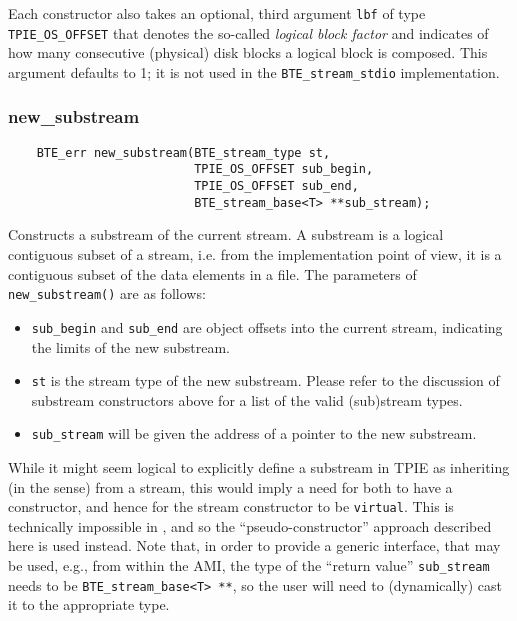 Each constructor also takes an optional, third argument
\lstinline|lbf| of type \lstinline|TPIE_OS_OFFSET| that denotes the
so-called \emph{logical block factor} and indicates of how many
consecutive (physical) disk blocks a logical block is composed. This
argument defaults to 1; it is not used in the
\lstinline|BTE_stream_stdio| implementation.

\vspace*{\baselineskip}
\subsubsection{new\_substream}

\begin{lstlisting}
    BTE_err new_substream(BTE_stream_type st, 
                          TPIE_OS_OFFSET sub_begin, 
                          TPIE_OS_OFFSET sub_end, 
                          BTE_stream_base<T> **sub_stream);
\end{lstlisting}

\noindent
Constructs a substream of the current stream.  A substream is a
logical contiguous subset of a stream, i.e. from the implementation
point of view, it is a contiguous subset of the data elements in a
file.  The parameters of \lstinline|new_substream()| are as follows:
\begin{itemize}
\item \lstinline|sub_begin| and \lstinline|sub_end| are object offsets
  into the current stream, indicating the limits of the new substream.
    
\item \lstinline|st| is the stream type of the new substream. Please
  refer to the discussion of substream constructors above for a list
  of the valid (sub)stream types.
  
\item \lstinline|sub_stream| will be given the address of a pointer to
  the new substream.
\end{itemize}

While it might seem logical to explicitly define a substream in TPIE
as inheriting (in the \CPP{} sense) from a stream, this would imply a
need for both to have a constructor, and hence for the stream
constructor to be \lstinline|virtual|. This is technically impossible
in \CPP{},  and so the ``pseudo-constructor''
approach described here is used instead. Note that, in order to provide a generic
interface, that may be used, e.g., from within the AMI, the type of
the ``return value'' \lstinline|sub_stream| needs to be
\lstinline|BTE_stream_base<T> **|, so the user will need to
(dynamically) cast it to the appropriate type.

